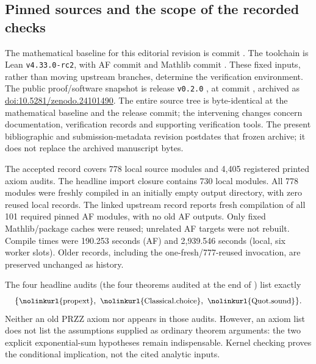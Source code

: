 \documentclass[11pt]{article}
\theoremstyle{definition}
\DeclareRobustCommand{\lean}[1]{\ifmmode\text{\small\nolinkurl{#1}}\else{\small\nolinkurl{#1}}\fi}
\begin{document}
\clearpage
\subsection{Pinned sources and the scope of the recorded checks}

The mathematical baseline for this editorial revision is commit
.
The toolchain is Lean \texttt{v4.33.0-rc2}, with AF commit
and Mathlib commit
.
These fixed inputs, rather than moving upstream branches, determine
the verification environment.
The public proof/software snapshot is release \texttt{v0.2.0}
\cite{Repo}, at commit
,
archived as \href{https://doi.org/10.5281/zenodo.24101490}{doi:10.5281/zenodo.24101490}.
The entire  source tree is byte-identical at the mathematical
baseline and the release commit; the intervening changes concern
documentation, verification records and supporting verification tools.
The present bibliographic and submission-metadata revision postdates
that frozen archive; it does not replace the archived manuscript bytes.

The accepted record
covers 778 local source modules and 4,405 registered printed axiom
audits. The headline import closure contains 730 local modules.
All 778 modules were freshly compiled in an initially empty output directory,
with zero reused local records. The linked upstream record
reports fresh compilation of all 101 required pinned AF modules, with no
old AF outputs. Only fixed Mathlib/package caches were reused; unrelated
AF targets were not rebuilt. Compile times were 190.253 seconds (AF)
and 2,939.546 seconds (local, six worker slots).
Older records, including the one-fresh/777-reused invocation, are
preserved unchanged as history.

The four headline audits (the four theorems audited at the end of
\lean{WuProportion}) list exactly
\[
 \{\lean{propext},\ \lean{Classical.choice},\ \lean{Quot.sound}\}.
\]
Neither an old PRZZ axiom nor \lean{sorryAx} appears in those audits.
However, an axiom list does not list the assumptions supplied as
ordinary theorem arguments: the two explicit exponential-sum
hypotheses remain indispensable. Kernel checking proves the
conditional implication, not the cited analytic inputs.
\end{document}
